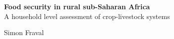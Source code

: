 \thispagestyle{empty}
\begin{center}
\Huge{\textbf{Food security in rural sub-Saharan Africa}} \\
\large{A household level assessment of crop-livestock systems} \\
\vspace*{1cm}
\vspace*{1cm}
\end{center}


\begin{center}
\vspace*{\fill}


\large{Simon Fraval}\\
\end{center}

